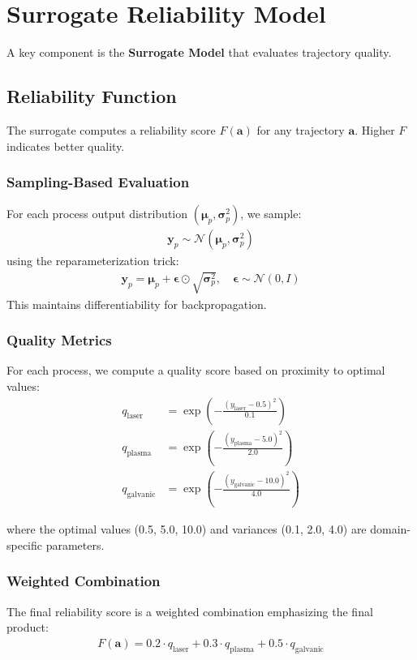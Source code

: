 \documentclass[11pt,a4paper]{article}
\begin{document}
\section{Surrogate Reliability Model}

A key component is the \textbf{Surrogate Model} that evaluates trajectory quality.

\subsection{Reliability Function}
The surrogate computes a reliability score $F(\mathbf{a})$ for any trajectory $\mathbf{a}$. Higher $F$ indicates better quality.

\subsubsection{Sampling-Based Evaluation}
For each process output distribution $(\boldsymbol{\mu}_p, \boldsymbol{\sigma}^2_p)$, we sample:
\begin{align}
\mathbf{y}_p \sim \mathcal{N}(\boldsymbol{\mu}_p, \boldsymbol{\sigma}^2_p)
\end{align}
using the reparameterization trick:
\begin{align}
\mathbf{y}_p = \boldsymbol{\mu}_p + \boldsymbol{\epsilon} \odot \sqrt{\boldsymbol{\sigma}^2_p}, \quad \boldsymbol{\epsilon} \sim \mathcal{N}(0, I)
\end{align}
This maintains differentiability for backpropagation.

\subsubsection{Quality Metrics}
For each process, we compute a quality score based on proximity to optimal values:
\begin{align}
q_{\text{laser}} &= \exp\left(-\frac{(y_{\text{laser}} - 0.5)^2}{0.1}\right) \\
q_{\text{plasma}} &= \exp\left(-\frac{(y_{\text{plasma}} - 5.0)^2}{2.0}\right) \\
q_{\text{galvanic}} &= \exp\left(-\frac{(y_{\text{galvanic}} - 10.0)^2}{4.0}\right)
\end{align}

where the optimal values (0.5, 5.0, 10.0) and variances (0.1, 2.0, 4.0) are domain-specific parameters.

\subsubsection{Weighted Combination}
The final reliability score is a weighted combination emphasizing the final product:
\begin{align}
F(\mathbf{a}) = 0.2 \cdot q_{\text{laser}} + 0.3 \cdot q_{\text{plasma}} + 0.5 \cdot q_{\text{galvanic}}
\end{align}
\end{document}

